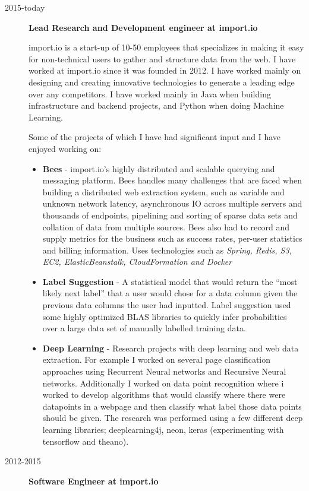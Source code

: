 \documentclass[a4paper]{article}
\def\tightlist{}
\begin{document}
\begin{description}
\item[2015-today]
\textbf{Lead Research and Development engineer at import.io}

import.io is a start-up of 10-50 employees that specializes in making it
easy for non-technical users to gather and structure data from the web.
I have worked at import.io since it was founded in 2012. I have worked
mainly on designing and creating innovative technologies to generate a
leading edge over any competitors. I have worked mainly in Java when
building infrastructure and backend projects, and Python when doing
Machine Learning.

Some of the projects of which I have had significant input and I have
enjoyed working on:

\begin{itemize}
\tightlist
\item
  \textbf{Bees} - import.io's highly distributed and scalable querying
  and messaging platform. Bees handles many challenges that are faced
  when building a distributed web extraction system, such as variable
  and unknown network latency, asynchronous IO across multiple servers
  and thousands of endpoints, pipelining and sorting of sparse data sets
  and collation of data from multiple sources. Bees also had to record
  and supply metrics for the business such as success rates, per-user
  statistics and billing information. Uses technologies such as
  \emph{Spring, Redis, S3, EC2, ElasticBeanstalk, CloudFormation and
  Docker}
\item
  \textbf{Label Suggestion} - A statistical model that would return the
  ``most likely next label'' that a user would chose for a data column
  given the previous data columns the user had inputted. Label
  suggestion used some highly optimized BLAS libraries to quickly infer
  probabilities over a large data set of manually labelled training
  data.
\item
  \textbf{Deep Learning} - Research projects with deep learning and web
  data extraction. For example I worked on several page classification
  approaches using Recurrent Neural networks and Recursive Neural
  networks. Additionally I worked on data point recognition where i
  worked to develop algorithms that would classify where there were
  datapoints in a webpage and then classify what label those data points
  should be given. The research was performed using a few different deep
  learning libraries; deeplearning4j, neon, keras (experimenting with
  tensorflow and theano).
\end{itemize}
\item[2012-2015]
\textbf{Software Engineer at import.io}


\end{description}
\end{document}
